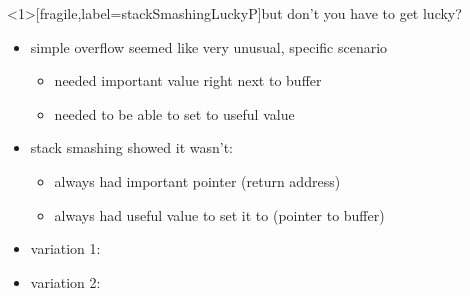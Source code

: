 \begin{frame}<1>[fragile,label=stackSmashingLuckyP]{but don't you have to get lucky?}
    \begin{itemize}
    \item simple overflow seemed like very unusual, specific scenario
        \begin{itemize}
        \item needed important value right next to buffer
        \item needed to be able to set to useful value
        \end{itemize}
    \item stack smashing showed it wasn't:
        \begin{itemize}
        \item always had important pointer (return address)
        \item always had useful value to set it to (pointer to buffer)
        \end{itemize}
    \vspace{.5cm}
    \item variation 1: 
    \item variation 2: 
    \end{itemize}
\end{frame}


